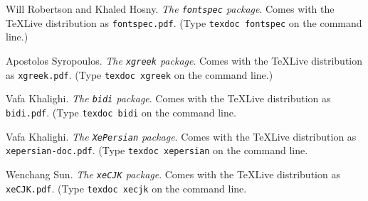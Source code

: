 \begin{thebibliography}{99}
 Will Robertson and Khaled Hosny.
    \newblock \emph{The \texttt{fontspec} package}.
    \newblock Comes with the \TeX Live distribution as
  \texttt{fontspec.pdf}. (Type \texttt{texdoc fontspec} on the command line.)

 Apostolos Syropoulos.
    \newblock \emph{The \texttt{xgreek} package}.
    \newblock Comes with the \TeX Live distribution as
  \texttt{xgreek.pdf}. (Type \texttt{texdoc xgreek} on the command line.)

 Vafa Khalighi.
    \newblock \emph{The \texttt{bidi} package}.
    \newblock Comes with the \TeX Live distribution as
  \texttt{bidi.pdf}. (Type \texttt{texdoc bidi} on the command line.

 Vafa Khalighi.
    \newblock \emph{The \texttt{XePersian} package}.
    \newblock Comes with the \TeX Live distribution as
  \texttt{xepersian-doc.pdf}. (Type \texttt{texdoc xepersian} on the command line.

 Wenchang Sun.
    \newblock \emph{The \texttt{xeCJK} package}.
    \newblock Comes with the \TeX Live distribution as
  \texttt{xeCJK.pdf}. (Type \texttt{texdoc xecjk} on the command line.

\end{thebibliography}


%

